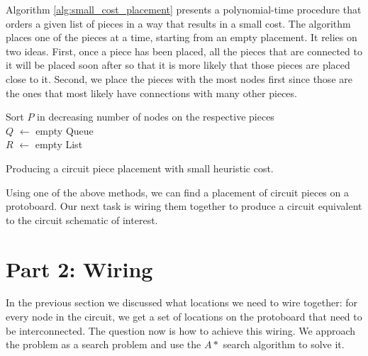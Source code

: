 Algorithm \ref{alg:small_cost_placement} presents a polynomial-time procedure
that orders a
given list of pieces in a way that results in a small cost. The algorithm places
one of the pieces at a time, starting from an empty placement. It relies
on two ideas. First, once a piece has been placed, all the pieces that are
connected to it will be placed soon after so that it is more likely that those
pieces are placed close to it. Second, we place the pieces with the most nodes
first since those are the ones that most likely have connections with many other
pieces.

\begin{algorithm}
\BlankLine
Sort $P$ in decreasing number of nodes on the respective pieces\\
$Q$ $\leftarrow$ empty Queue\\
$R$ $\leftarrow$ empty List\\
\caption{Producing a circuit piece placement with small heuristic cost.}
\label{alg:small_cost_placement}
\end{algorithm}

Using one of the above methods, we can find a placement of circuit pieces on a
protoboard. Our next task is wiring them together to produce a circuit
equivalent to the circuit schematic of interest.

\section{Part 2: Wiring}

In the previous section we discussed what locations we need to wire together:
for every node in the circuit, we get a set of locations on the protoboard that
need to be interconnected. The question now is how to achieve this wiring. We
approach the problem as a search problem and use the $A*$ search algorithm to
solve it.


